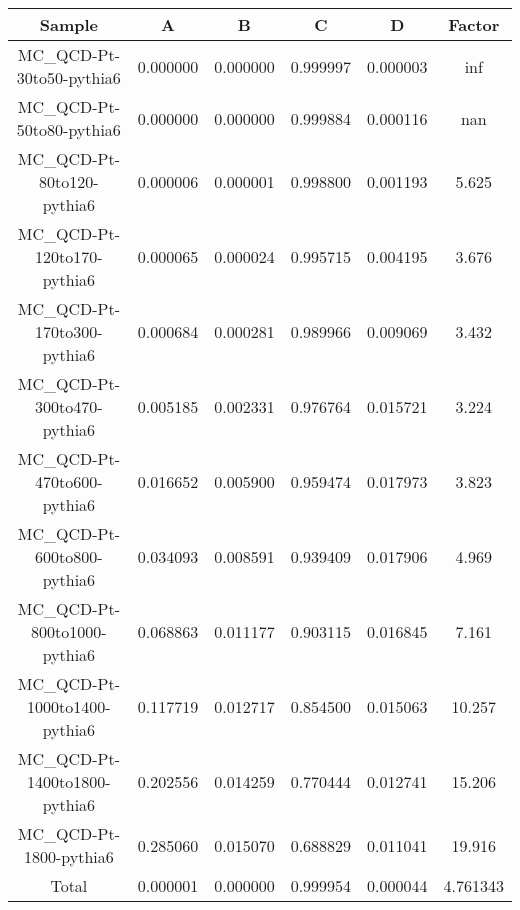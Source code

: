 
\begin{tabular}{|c||c|c|c|c||c|}
\hline
Sample & A & B & C & D & Factor \\
\hline \hline
MC\_QCD-Pt-30to50-pythia6 & 0.000000 & 0.000000 & 0.999997 & 0.000003 & inf \\
MC\_QCD-Pt-50to80-pythia6 & 0.000000 & 0.000000 & 0.999884 & 0.000116 & nan \\
MC\_QCD-Pt-80to120-pythia6 & 0.000006 & 0.000001 & 0.998800 & 0.001193 & 5.625 \\
MC\_QCD-Pt-120to170-pythia6 & 0.000065 & 0.000024 & 0.995715 & 0.004195 & 3.676 \\
MC\_QCD-Pt-170to300-pythia6 & 0.000684 & 0.000281 & 0.989966 & 0.009069 & 3.432 \\
MC\_QCD-Pt-300to470-pythia6 & 0.005185 & 0.002331 & 0.976764 & 0.015721 & 3.224 \\
MC\_QCD-Pt-470to600-pythia6 & 0.016652 & 0.005900 & 0.959474 & 0.017973 & 3.823 \\
MC\_QCD-Pt-600to800-pythia6 & 0.034093 & 0.008591 & 0.939409 & 0.017906 & 4.969 \\
MC\_QCD-Pt-800to1000-pythia6 & 0.068863 & 0.011177 & 0.903115 & 0.016845 & 7.161 \\
MC\_QCD-Pt-1000to1400-pythia6 & 0.117719 & 0.012717 & 0.854500 & 0.015063 & 10.257 \\
MC\_QCD-Pt-1400to1800-pythia6 & 0.202556 & 0.014259 & 0.770444 & 0.012741 & 15.206 \\
MC\_QCD-Pt-1800-pythia6 & 0.285060 & 0.015070 & 0.688829 & 0.011041 & 19.916 \\
\hline \hline
Total & 0.000001 & 0.000000 & 0.999954 & 0.000044 & 4.761343 \\
\hline
\end{tabular}

